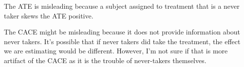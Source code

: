 \documentclass[
]{article}
\newenvironment{Shaded}{\begin{snugshade}}{\end{snugshade}}
\newcommand{\AttributeTok}[1]{\textcolor[rgb]{0.13,0.29,0.53}{#1}}
\newcommand{\DecValTok}[1]{\textcolor[rgb]{0.00,0.00,0.81}{#1}}
\newcommand{\FunctionTok}[1]{\textcolor[rgb]{0.13,0.29,0.53}{\textbf{#1}}}
\newcommand{\NormalTok}[1]{#1}
\newcommand{\OtherTok}[1]{\textcolor[rgb]{0.56,0.35,0.01}{#1}}
\newcommand{\SpecialCharTok}[1]{\textcolor[rgb]{0.81,0.36,0.00}{\textbf{#1}}}
\newcommand{\StringTok}[1]{\textcolor[rgb]{0.31,0.60,0.02}{#1}}
\begin{document}
\begin{Shaded}
\end{Shaded}

The ATE is misleading because a subject assigned to treatment that is a
never taker skews the ATE positive.

The CACE might be misleading because it does not provide information
about never takers. It's possible that if never takers did take the
treatment, the effect we are estimating would be different. However, I'm
not sure if that is more artifact of the CACE as it is the trouble of
never-takers themselves.
\end{document}

